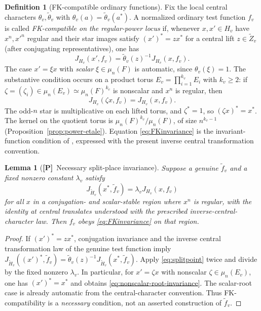 \documentclass[11pt]{article}
\newcommand{\Ptag}{\textnormal{\textbf{[P]}}}
\theoremstyle{plain}
\newtheorem{lemma}[theorem]{Lemma}
\theoremstyle{definition}
\newtheorem{definition}[theorem]{Definition}
\begin{document}
\begin{definition}[FK-compatible ordinary functions]\label{def:FKcompatible}
Fix the local central characters $\theta_v,\widetilde\theta_v$
with $\theta_v(a)=\widetilde\theta_v(a^*)$.  A normalized
ordinary test function $f_v$ is called \emph{FK-compatible on the
regular-power locus} if, whenever $x,x'\in H_v$ have $x^n,x'^n$
regular and their star images satisfy
$({x'})^*=z x^*$ for a central lift $z\in\widetilde Z_v$
(after conjugating representatives), one has
\begin{equation}\label{eq:FKinvariance}
 J_{H_v}(x',f_v)
   =\widetilde\theta_v(z)^{-1}J_{H_v}(x,f_v).
\end{equation}
The case $x'=\xi x$ with \emph{scalar} $\xi\in\mu_n(F)$
is automatic, since $\theta_v(\xi)=1$.  The substantive
condition occurs on a product torus
$E_v=\prod_{i=1}^{k_v}E_i$ with $k_v\ge2$:
if $\zeta=(\zeta_i)\in\mu_n(E_v)\simeq\mu_n(F)^{k_v}$
is nonscalar and $x^n$ is regular, then
\begin{equation}\label{eq:nonscalar-root-invariance}
 J_{H_v}(\zeta x,f_v)=J_{H_v}(x,f_v).
\end{equation}
The odd-$n$ star is multiplicative on each lifted torus, and
$\zeta^*=1$, so $(\zeta x)^*=x^*$.  The kernel on the
quotient torus is $\mu_n(F)^{k_v}/\mu_n(F)$, of size
$n^{k_v-1}$ (Proposition~\ref{prop:power-etale}).
Equation \eqref{eq:FKinvariance} is the invariant-function
condition of \cite[\S6]{FK}, expressed with the present
inverse central transformation convention.
\end{definition}

\begin{lemma}[\Ptag\ Necessary split-place invariance]
\label{lem:FKnecessary}
Suppose a genuine $\widetilde f_v$ and a fixed nonzero constant
$\lambda_v$ satisfy
\begin{equation}\label{eq:splitpoint}
 J_{\widetilde H_v}(x^*,\widetilde f_v)
      =\lambda_v J_{H_v}(x,f_v)
\end{equation}
for all $x$ in a conjugation- and scalar-stable region where
$x^n$ is regular, with the identity at central translates understood
with the prescribed inverse-central-character law.  Then $f_v$ obeys
\eqref{eq:FKinvariance} on that region.
\end{lemma}
\begin{proof}
If $({x'})^*=z x^*$, conjugation invariance and the inverse
central transformation law of the genuine test function imply
$J_{\widetilde H_v}(({x'})^*,\widetilde f_v)
=\widetilde\theta_v(z)^{-1}
J_{\widetilde H_v}(x^*,\widetilde f_v)$.
Apply \eqref{eq:splitpoint} twice and divide by the fixed
nonzero $\lambda_v$.  In particular, for $x'=\zeta x$ with nonscalar
$\zeta\in\mu_n(E_v)$, one has $({x'})^*=x^*$ and obtains
\eqref{eq:nonscalar-root-invariance}.  The scalar-root case is
already automatic from the central-character convention.
Thus FK-compatibility is a \emph{necessary} condition,
not an asserted construction of $\widetilde f_v$.
\end{proof}
\end{document}
